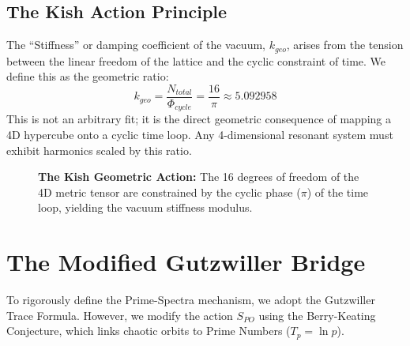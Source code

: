 \documentclass[11pt, letterpaper, openany]{book}
\begin{document}
\subsection{The Kish Action Principle}
The ``Stiffness'' or damping coefficient of the vacuum, $k_{geo}$, arises from the tension between the linear freedom of the lattice and the cyclic constraint of time. We define this as the geometric ratio:
\begin{equation}
    \label{eq:kish_constant}
    k_{geo} = \frac{N_{total}}{\Phi_{cycle}} = \frac{16}{\pi} \approx 5.092958
\end{equation}
This is not an arbitrary fit; it is the direct geometric consequence of mapping a 4D hypercube onto a cyclic time loop. Any 4-dimensional resonant system must exhibit harmonics scaled by this ratio.

\begin{figure}[h]
\centering
{}
\caption{\textbf{The Kish Geometric Action:} The 16 degrees of freedom of the 4D metric tensor are constrained by the cyclic phase ($\pi$) of the time loop, yielding the vacuum stiffness modulus.}
\label{fig:kish_action}
\end{figure}

\section{The Modified Gutzwiller Bridge}
To rigorously define the Prime-Spectra mechanism, we adopt the Gutzwiller Trace Formula. However, we modify the action $S_{PO}$ using the Berry-Keating Conjecture, which links chaotic orbits to Prime Numbers ($T_p = \ln p$).
\end{document}
